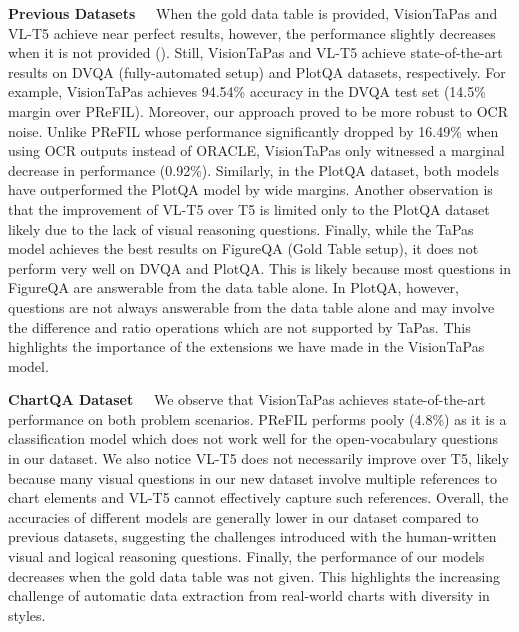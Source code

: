 \noindent \textbf{Previous Datasets~~} 
When the gold data table is provided, VisionTaPas and VL-T5 achieve near perfect results, however, the performance slightly decreases when it is not provided 
().
Still, VisionTaPas and VL-T5 achieve state-of-the-art results on DVQA (fully-automated setup) and PlotQA  datasets, respectively. For example, VisionTaPas achieves 94.54\% accuracy in the DVQA test set (14.5\% margin over PReFIL). Moreover, our approach proved to be more robust to OCR noise. 
Unlike PReFIL whose performance significantly dropped by 16.49\% when using OCR outputs
instead of ORACLE, VisionTaPas only witnessed a marginal decrease in performance (0.92\%). Similarly, in the PlotQA dataset, both models have outperformed the PlotQA model by wide margins. 
Another observation is that the improvement of VL-T5 over T5 is limited only to the PlotQA  dataset  likely due to the lack of visual reasoning questions.   Finally, 
while the TaPas model achieves the best results on FigureQA (Gold Table setup), it does not perform very well on DVQA and PlotQA. 
This is likely because most questions in FigureQA are answerable from the data table alone. In PlotQA, however, questions are not always answerable from the data table alone and may involve the difference and ratio operations which are not supported by TaPas. This highlights the importance of the extensions we have made in the VisionTaPas model.



\noindent \textbf{ChartQA Dataset~~}  We observe that VisionTaPas achieves state-of-the-art performance on both problem scenarios. PReFIL performs pooly (4.8\%) as it is a classification model which does not work well for  the open-vocabulary questions in our dataset. We also notice VL-T5 does not necessarily improve over T5, likely because many visual questions in our new dataset involve %
multiple references to chart elements and VL-T5 cannot effectively capture such references.
Overall, 
the accuracies of different models are generally lower in our dataset compared to previous datasets, suggesting the challenges introduced with the human-written 
visual and logical reasoning questions. Finally, the performance of our models %
decreases when the gold data table was not given.
This highlights the increasing challenge of automatic data extraction from real-world charts with diversity in 
styles.

